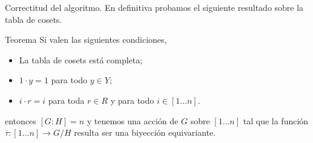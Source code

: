 \documentclass[aspectratio=169, 9pt]{beamer}
\renewcommand\qedsymbol{\textcolor{orange}{$\blacksquare$}}
\newcommand{\In}{[1 \dots n]}
\newcommand{\ol}{\overline}
\begin{document}
\begin{frame}[fragile]{Correctitud del algoritmo.}
	En definitiva probamos el siguiente resultado sobre la tabla de cosets.
	\pause
	\begin{alertblock}{Teorema}
		Si valen las siguientes condiciones,
		\begin{itemize}
			\item La tabla de cosets está completa;
			\item $1\cdot y = 1$ para todo $y \in Y$;
			\item $i \cdot r  = i$ para toda $r \in R$ y para todo $i \in \In$.
		\end{itemize}
		\pause
		entonces $[G:H] = n$ y tenemos una acción de $G$ sobre $\In$ tal que la función $\ol \tau: \In \to G/H$ resulta ser una biyección equivariante.
	\end{alertblock}
	\medskip
\end{frame}

%	
%			
%		
\end{document}
